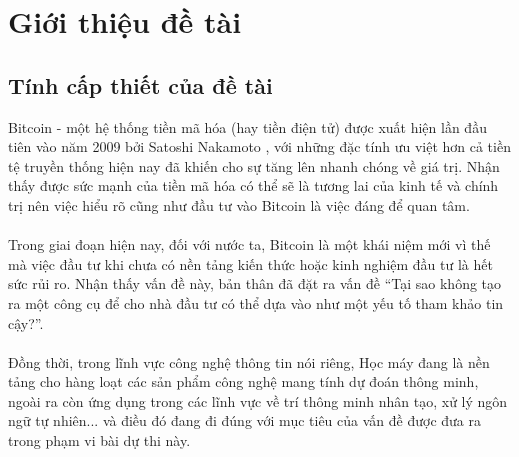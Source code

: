 \chapter{Giới thiệu đề tài}
\section{Tính cấp thiết của đề tài}
Bitcoin - một hệ thống tiền mã hóa (hay tiền điện tử) được xuất hiện lần đầu tiên 
vào năm 2009 bởi Satoshi Nakamoto \cite{BitcoinPaper}, với những đặc tính ưu việt hơn cả tiền tệ 
truyền thống hiện nay đã khiến cho sự tăng lên nhanh chóng về giá trị. Nhận thấy 
được sức mạnh của tiền mã hóa có thể sẽ là tương lai của kinh tế và chính trị 
nên việc hiểu rõ cũng như đầu tư vào Bitcoin là việc đáng để quan tâm.\\\\
Trong giai đoạn hiện nay, đối với nước ta, Bitcoin là một khái niệm mới vì thế 
mà việc đầu tư khi chưa có nền tảng kiến thức hoặc kinh nghiệm đầu tư là hết 
sức rủi ro. Nhận thấy vấn đề này, bản thân đã đặt ra vấn đề ``Tại sao không 
tạo ra một công cụ để cho nhà đầu tư có thể dựa vào như một yếu tố tham khảo 
tin cậy?''.\\\\
Đồng thời, trong lĩnh vực công nghệ thông tin nói riêng, Học máy đang là 
nền tảng cho hàng loạt các sản phẩm công nghệ mang tính dự đoán thông minh, ngoài 
ra còn ứng dụng trong các lĩnh vực về trí thông minh nhân tạo, xử lý ngôn ngữ 
tự nhiên... và điều đó đang đi đúng với mục tiêu của vấn đề được đưa ra trong phạm 
vi bài dự thi này.

